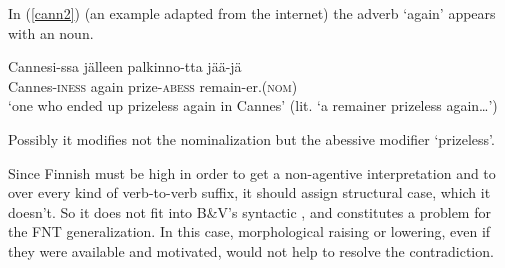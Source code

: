 \documentclass[output=paper,
modfonts
]{LSP/langsci}
\newcommand{\rf}[1]{(\ref{#1})}
\begin{document}
\begin{exe}
\ex\label{particle}
\begin{xlist}



\end{xlist}
 \end{exe} 
 In \rf{cann2} (an example adapted from the internet) the adverb
 `again' appears with an  noun.
\begin{exe}
\ex\label{cann2} 
 \gll Cannesi-ssa jälleen palkinno-tta jää-jä \\
    Cannes-\textsc{iness}  again prize-\textsc{abess} remain-er.(\textsc{nom})\\
    \glt `one who ended up prizeless again in Cannes' (lit. `a remainer prizeless again…')
\end{exe}
Possibly it modifies not the nominalization but the abessive modifier 
`prizeless'.

Since Finnish  must be high in order to get a non-agentive interpretation and to
 over every kind of verb-to-verb suffix, it should assign structural case, which it
doesn't.  So it does not fit into B\&V's syntactic , and constitutes a problem for the
FNT generalization.  In this case, morphological raising or lowering, even if they were
available and motivated, would not help to resolve the contradiction.
\end{document}
